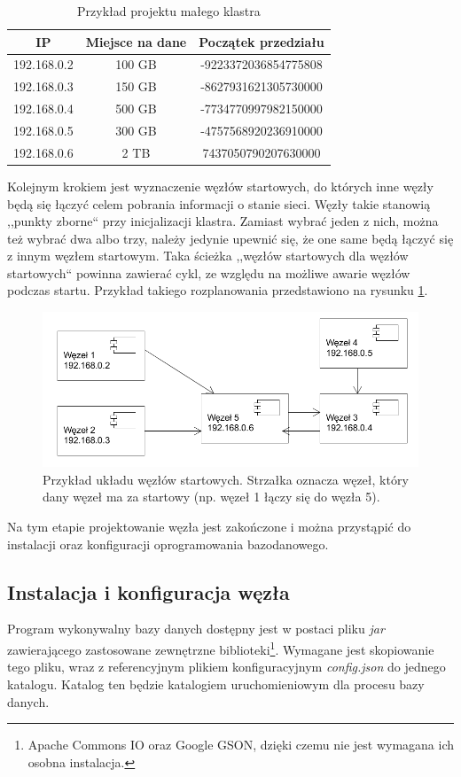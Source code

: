 \documentclass[a4paper,polish,12pt,twoside]{article}
\begin{document}
\begin{table} \centering \begin{tabular}{|c|c|c|}
\hline IP & Miejsce na dane & Początek przedziału \\ \hline
192.168.0.2 & 100 GB & -9223372036854775808 \\
192.168.0.3 & 150 GB & -8627931621305730000 \\
192.168.0.4 & 500 GB & -7734770997982150000 \\
192.168.0.5 & 300 GB & -4757568920236910000 \\
192.168.0.6 & 2 TB & 7437050790207630000 \\
\hline \end{tabular}
\caption{Przykład projektu małego klastra} \label{tab:sample_clusterplan} \end{table}

Kolejnym krokiem jest wyznaczenie węzłów startowych, do których inne  węzły będą się łączyć celem pobrania informacji o stanie sieci. Węzły takie stanowią ,,punkty zborne`` przy inicjalizacji klastra. Zamiast wybrać jeden z nich, można też wybrać dwa albo trzy, należy jedynie upewnić się, że one same będą łączyć się z innym węzłem startowym. Taka ścieżka ,,węzłów startowych dla węzłów startowych`` powinna zawierać cykl, ze względu na możliwe awarie węzłów podczas startu. Przykład takiego rozplanowania przedstawiono na rysunku \ref{fig:start_nodes}.

	\begin{figure}[h]
		\centering \includegraphics[width=16cm]{start_nodes}
		\caption{Przykład układu węzłów startowych. Strzałka oznacza węzeł, który dany węzeł ma za startowy (np. węzeł 1 łączy się do węzła 5).}
		\label{fig:start_nodes}
	\end{figure}

Na tym etapie projektowanie węzła jest zakończone i można przystąpić do instalacji oraz konfiguracji oprogramowania bazodanowego.

	\subsection{Instalacja i konfiguracja węzła}
\label{sec:part:sample_clusterplan}
Program wykonywalny bazy danych dostępny jest w postaci pliku \textit{jar} zawierającego zastosowane zewnętrzne biblioteki\footnote{Apache Commons IO oraz Google GSON, dzięki czemu nie jest wymagana ich osobna instalacja.}. Wymagane jest skopiowanie tego pliku, wraz z referencyjnym plikiem konfiguracyjnym \textit{config.json} do jednego katalogu. Katalog ten będzie katalogiem uruchomieniowym dla procesu bazy danych.
\end{document}

